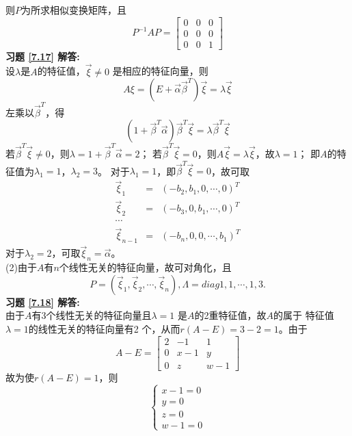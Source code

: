 \documentclass[a4paper]{book}
\begin{document}
则$P$为所求相似变换矩阵，且
\begin{equation*}
 P^{-1}AP=\begin{bmatrix}0&0&0\\0&0&0\\0&0&1\end{bmatrix}
\end{equation*}
\textbf{习题 \ref{7.17} 解答:}\\
设$\lambda$是$A$的特征值，$\vec{\xi}\neq0$ 是相应的特征向量，则
\begin{equation*}
A\xi=(E+\vec{\alpha}\vec{\beta}^T)\vec{\xi}=\lambda\vec{\xi}
\end{equation*}
左乘以$\vec{\beta}^T$，得
\begin{equation*}
(1+\vec{\beta}^T\vec{\alpha})\vec{\beta}^T\vec{\xi}=\lambda\vec{\beta}^T\vec{\xi}
\end{equation*}
若$\vec{\beta}^T\vec{\xi}\neq0$，则$\lambda=1+\vec{\beta}^T\vec{\alpha}=2$；
若$\vec{\beta}^T\vec{\xi}=0$，则$A\vec{\xi}=\lambda\vec{\xi}$，故$\lambda=1$；
即$A$的特征值为$\lambda_1=1$，$\lambda_2=3$。
对于$\lambda_1=1$，即$\vec{\beta}^T\vec{\xi}=0$，故可取
\begin{eqnarray*}
  \vec{\xi}_1&=& (-b_2,b_1,0,\cdots,0)^T \\
  \vec{\xi}_2&=& (-b_3,0,b_1,\cdots,0)^T\\
  \cdots \\
  \vec{\xi}_{n-1} &=& (-b_n,0,0,\cdots,b_1)^T
\end{eqnarray*}
对于$\lambda_2=2$，可取$\vec{\xi}_n=\vec{\alpha}$。\\
(2)由于$A$有$n$个线性无关的特征向量，故可对角化，且
\begin{equation*}
P=(\vec{\xi}_1,\vec{\xi}_2,\cdots,\vec{\xi}_n),\Lambda=diag{1,1,\cdots,1,3}.
\end{equation*}
\textbf{习题 \ref{7.18} 解答:}\\
由于$A$有3个线性无关的特征向量且$\lambda=1$ 是$A$的2重特征值，故$A$的属于
特征值$\lambda=1$的线性无关的特征向量有2 个，从而$r(A-E)=3-2=1$。由于
\begin{equation*}
  A-E=\begin{bmatrix}2&-1&1\\0&x-1&y\\0&z&w-1\end{bmatrix}
\end{equation*}
故为使$r(A-E)=1$，则
\begin{equation*}
 \begin{cases}
 x-1=0\\
 y=0\\
 z=0\\
 w-1=0
 \end{cases}
\end{equation*}
\end{document}
